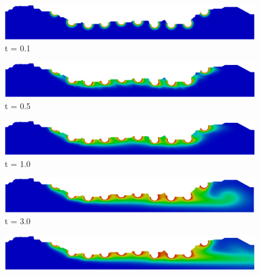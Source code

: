 \begin{figure}[H]
     \begin{minipage}{.50\linewidth}
      \centering
      \includegraphics[scale=0.18]{./02_chaps/cap_solution/figure/conc1_RealStrut1.png}\\
      t = 0.1
     \end{minipage}%
     \begin{minipage}{.50\linewidth}
      \centering
      \includegraphics[scale=0.18]{./02_chaps/cap_solution/figure/conc1_RealStrut2.png}\\
      t = 0.5
     \end{minipage}
     \begin{minipage}{.50\linewidth}
     \medskip
      \centering
      \includegraphics[scale=0.18]{./02_chaps/cap_solution/figure/conc1_RealStrut3.png}\\
      t = 1.0
     \end{minipage}%
     \begin{minipage}{.50\linewidth}
     \medskip
      \centering
      \includegraphics[scale=0.18]{./02_chaps/cap_solution/figure/conc1_RealStrut4.png}\\
      t = 3.0
     \end{minipage}
     \begin{minipage}{.50\linewidth}
      \centering
      \includegraphics[scale=0.18]{./02_chaps/cap_solution/figure/conc1_RealStrut5.png}\\

\end{minipage}
\end{figure}
